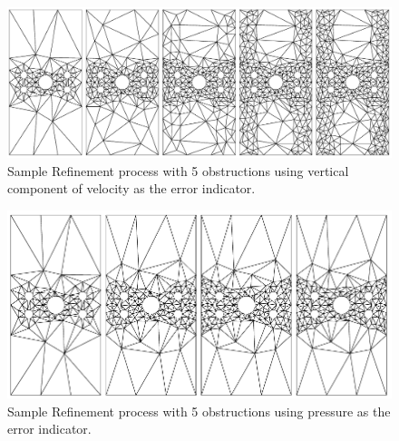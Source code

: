 \documentclass[wrr]{agutex}  %
\begin{document}
\begin{article}
\begin{figure}[h]
\includegraphics[height=\h]{../plots/v_5_row.pdf}
\caption{Sample Refinement process with 5 obstructions using vertical component of velocity as the error indicator.}   
\end{figure}

\begin{figure}[h]
\includegraphics[height=\h]{../plots/p_5_row.pdf}
\caption{Sample Refinement process with 5 obstructions using pressure as the error indicator.}   
\end{figure}


\end{article}
\end{document}
